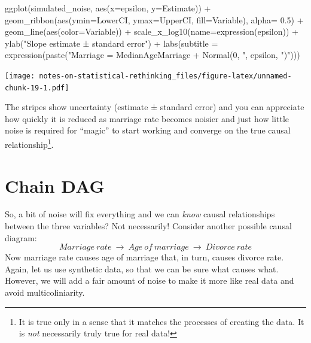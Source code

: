 \documentclass[
]{book}
\newenvironment{Shaded}{\begin{snugshade}}{\end{snugshade}}
\newcommand{\AttributeTok}[1]{\textcolor[rgb]{0.77,0.63,0.00}{#1}}
\newcommand{\FloatTok}[1]{\textcolor[rgb]{0.00,0.00,0.81}{#1}}
\newcommand{\FunctionTok}[1]{\textcolor[rgb]{0.00,0.00,0.00}{#1}}
\newcommand{\NormalTok}[1]{#1}
\newcommand{\SpecialCharTok}[1]{\textcolor[rgb]{0.00,0.00,0.00}{#1}}
\newcommand{\StringTok}[1]{\textcolor[rgb]{0.31,0.60,0.02}{#1}}
\begin{document}
\begin{Shaded}
\begin{Highlighting}[]
\FunctionTok{ggplot}\NormalTok{(simulated\_noise, }\FunctionTok{aes}\NormalTok{(}\AttributeTok{x=}\NormalTok{epsilon, }\AttributeTok{y=}\NormalTok{Estimate)) }\SpecialCharTok{+} 
  \FunctionTok{geom\_ribbon}\NormalTok{(}\FunctionTok{aes}\NormalTok{(}\AttributeTok{ymin=}\NormalTok{LowerCI, }\AttributeTok{ymax=}\NormalTok{UpperCI, }\AttributeTok{fill=}\NormalTok{Variable), }\AttributeTok{alpha=} \FloatTok{0.5}\NormalTok{) }\SpecialCharTok{+} 
  \FunctionTok{geom\_line}\NormalTok{(}\FunctionTok{aes}\NormalTok{(}\AttributeTok{color=}\NormalTok{Variable)) }\SpecialCharTok{+} 
  \FunctionTok{scale\_x\_log10}\NormalTok{(}\AttributeTok{name=}\FunctionTok{expression}\NormalTok{(epsilon)) }\SpecialCharTok{+} 
  \FunctionTok{ylab}\NormalTok{(}\StringTok{"Slope estimate  ± standard error"}\NormalTok{) }\SpecialCharTok{+}
  \FunctionTok{labs}\NormalTok{(}\AttributeTok{subtitle =} \FunctionTok{expression}\NormalTok{(}\FunctionTok{paste}\NormalTok{(}\StringTok{"Marriage = MedianAgeMarriage + Normal(0, "}\NormalTok{, epsilon, }\StringTok{")"}\NormalTok{)))}
\end{Highlighting}
\end{Shaded}

\texttt{[image: notes-on-statistical-rethinking\_files/figure-latex/unnamed-chunk-19-1.pdf]}

The stripes show uncertainty (estimate ± standard error) and you can appreciate how quickly it is reduced as marriage rate becomes noisier and just how little noise is required for ``magic'' to start working and converge on the true causal relationship\footnote{It is true only in a sense that it matches the processes of creating the data. It is \emph{not} necessarily truly true for real data!}.

\hypertarget{chain-dag}{%
\section{Chain DAG}\label{chain-dag}}

So, a bit of noise will fix everything and we can \emph{know} causal relationships between the three variables? Not necessarily! Consider another possible causal diagram:
\[Marriage~rate~\rightarrow~Age~of~marriage~\rightarrow~Divorce~rate\]
Now marriage rate causes age of marriage that, in turn, causes divorce rate. Again, let us use synthetic data, so that we can be sure what causes what. However, we will add a fair amount of noise to make it more like real data and avoid multicoliniarity.
\end{document}
